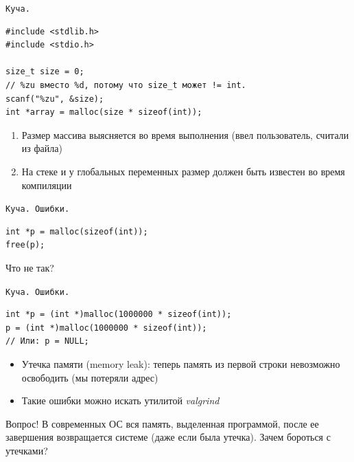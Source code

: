 \documentclass[pdf, 10pt, unicode]{beamer}
\begin{document}
\begin{frame}[fragile]{{\tt Куча. }}
\begin{verbatim}
#include <stdlib.h>
#include <stdio.h>

size_t size = 0;
// %zu вместо %d, потому что size_t может != int.
scanf("%zu", &size);
int *array = malloc(size * sizeof(int));
\end{verbatim}

\begin{enumerate}
  \item Размер массива выясняется во время выполнения (ввел пользователь, считали из файла)
  \item На стеке и у глобальных переменных размер должен быть известен во время компиляции
\end{enumerate}

\end{frame}

\begin{frame}[fragile]{{\tt Куча. Ошибки.}}

\begin{verbatim}
int *p = malloc(sizeof(int));
free(p);
\end{verbatim}
Что не так?
\begin{enumerate}
\end{enumerate}

\end{frame}

\begin{frame}[fragile]{{\tt Куча. Ошибки.}}
\begin{verbatim}
int *p = (int *)malloc(1000000 * sizeof(int));
p = (int *)malloc(1000000 * sizeof(int));
// Или: p = NULL;
\end{verbatim}
\begin{itemize}
  \item Утечка памяти (memory leak): теперь память из первой строки невозможно освободить (мы потеряли адрес)
  \item Такие ошибки можно искать утилитой \emph{valgrind}
\end{itemize}
Вопрос! В современных ОС вся память, выделенная программой, после ее завершения возвращается системе (даже если была утечка). Зачем бороться с утечками?
\begin{enumerate}
\end{enumerate}

\end{frame}
\end{document}
